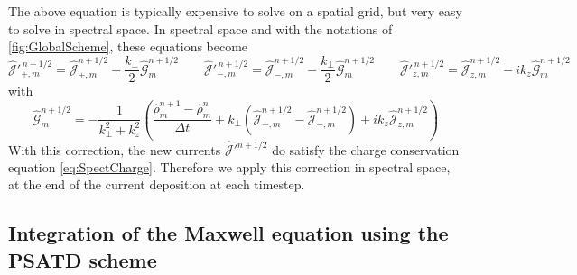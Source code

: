 \documentclass[1p,times]{elsarticle}
\newcommand{\spectral}[1]{\hat{\mathcal{#1}}}
\begin{document}
The above equation is typically expensive to solve on a spatial grid, but
very easy to solve in spectral space. In spectral space and with the
notations of \cref{fig:GlobalScheme}, these equations become
\begin{equation} \spectral{J}'^{\,n+1/2}_{+,m} = \spectral{J}^{n+1/2}_{+,m} +
\frac{k_\perp}{2} \spectral{G}^{n+1/2}_m
\qquad
\spectral{J}'^{\,n+1/2}_{-,m} = \spectral{J}^{n+1/2}_{-,m} - \frac{k_\perp}{2} \spectral{G}^{n+1/2}_m
\qquad \spectral{J}'^{\,n+1/2}_{z,m} = \spectral{J}^{n+1/2}_{z,m} - ik_z
\spectral{G}^{n+1/2}_m\end{equation}
with
\begin{equation} \spectral{G}^{n+1/2}_m = - \frac{1}{k_\perp^2 + k_z^2}\left(
  \frac{\spectral{\rho}^{n+1}_m -\spectral{\rho}^{n}_m}{\Delta t} + k_\perp
  (\spectral{J}^{n+1/2}_{+,m} -\spectral{J}^{n+1/2}_{-,m}) + ik_z\spectral{J}^{n+1/2}_{z,m}  \right) \end{equation}
With this correction, the new currents $\spectral{J}'^{n+1/2}$ do satisfy
the charge conservation equation \cref{eq:SpectCharge}. Therefore we apply this
correction in spectral space, at the end of the current deposition at each timestep.

\subsection{Integration of the Maxwell equation using the PSATD scheme}
\label{sec:FieldIntegration}
\end{document}
